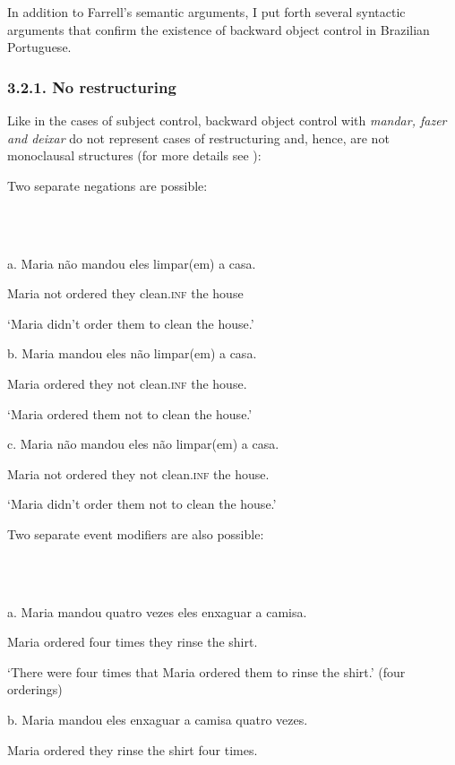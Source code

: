 \documentclass[output=paper]{langsci/langscibook}
\begin{document}
In addition to Farrell’s semantic arguments, I put forth several syntactic arguments that confirm the existence of backward object control in Brazilian Portuguese.

\subsubsection{ 3.2.1. No restructuring}

Like in the cases of subject control, backward object control with \textit{mandar, fazer and deixar}\textbf{ }do not represent cases of restructuring and, hence, are not monoclausal structures (for more details see \citealt{Cyrino2010}):

Two separate negations are possible:

\ea%
    \label{ex:key:14}
    \gll\\
        \\
    \glt
    \z

          a.  Maria não   mandou   eles limpar(em)   a casa.

    Maria not   ordered   they clean.\textsc{inf}   the house

    ‘Maria didn’t order them to clean the house.’

  b.  Maria mandou   eles não   limpar(em)   a casa.

    Maria ordered   they not   clean.\textsc{inf}   the house.

    ‘Maria ordered them not  to clean  the house.’

  c.  Maria não   mandou   eles não limpar(em)   a casa.

    Maria  not   ordered   they not clean.\textsc{inf}   the house.

    ‘Maria didn’t order them not to clean the house.’

Two separate event modifiers are also possible:

\ea%
    \label{ex:key:15}
    \gll\\
        \\
    \glt
    \z

          a.  Maria mandou   quatro vezes  eles enxaguar   a camisa.

    Maria ordered    four    times  they rinse   the shirt.

‘There were four times that Maria ordered them to rinse the shirt.’ (four orderings)

  b.  Maria mandou eles   enxaguar   a camisa   quatro vezes.

    Maria ordered they   rinse     the shirt  four times.
\end{document}
